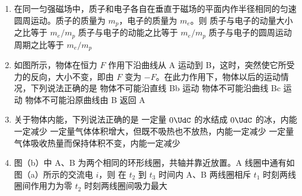 \documentclass[\gkver]{gaokaozhenti}
\begin{document}
\begin{enumerate}
\item
在同一匀强磁场中，质子和电子各自在垂直于磁场的平面内作半径相同的匀速圆周运动。质子的质量为 $m_{p}$，电子的质量为 $m_{e}$。则
{质子与电子的动量大小之比等于 $m_{e}/m_{p}$}
{质子与电子的动能之比等于 $m_{e}/m_{p}$}
{质子与电子的圆周运动周期之比等于 $m_{e}/m_{p}$}

\item
如图所示，物体在恒力 $F$ 作用下沿曲线从 A 运动到 B，这时，突然使它所受力的反向，大小不变，即由 $F$ 变为 $-F$。在此力作用下，物体以后的运动情况，下列说法正确的是
\onepicture[w=6cm]{}
{物体不可能沿直线 Bb 运动}
{物体不可能沿曲线 Bc 运动}
{物体不可能沿原曲线由 B 返回 A}

\item
关于物体内能，下列说法正确的是
{一定量 $0\UdC$ 的水结成 $0\UdC$ 的冰，内能一定减少}
{一定量气体体积增大，但既不吸热也不放热，内能一定减少}
{一定量气体吸收热量而保持体积不变，内能一定减少}

\item
图（b）中 A、B 为两个相同的环形线圈，共轴并靠近放置。A 线圈中通有如图（a）所示的交流电 $i$，则
\onepicture[w=10cm]{}
{在 $t_{2}$ 到 $t_{3}$ 时间内 A、B 两线圈相斥}
{$t_{1}$ 时刻两线圈间作用力为零}
{$t_{2}$ 时刻两线圈间吸力最大}


\end{enumerate}
\end{document}
